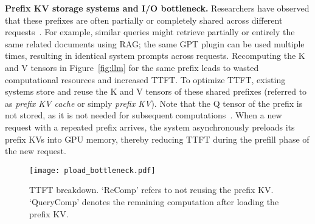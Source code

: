 \noindent \textbf{Prefix KV storage systems and I/O bottleneck.}
Researchers have observed that these prefixes are often partially or completely shared across different requests~\cite{sglang-arxiv23, chunkattention-arxiv24, cachegen-sigcomm24, ragcache-arxiv24, promptcache-mlsys24, attentionstore-atc24}. For example, similar queries might retrieve partially or entirely the same related documents using RAG; the same GPT plugin can be used multiple times, resulting in identical system prompts across requests. 
Recomputing the K and V tensors in Figure~\ref{fig:llm} for the same prefix leads to wasted computational resources and increased TTFT. To optimize TTFT, existing systems store and reuse the K and V tensors of these shared prefixes (referred to as \textit{prefix KV cache} or simply \textit{prefix KV}). Note that the Q tensor of the prefix is not stored, as it is not needed for subsequent computations~\cite{attentionstore-atc24}. When a new request with a repeated prefix arrives, the system asynchronously preloads its prefix KVs into GPU memory, thereby reducing TTFT during the prefill phase of the new request.


\begin{figure}
	\centering
	\texttt{[image: pload\_bottleneck.pdf]}
	\vspace{-0.1in}
	\caption{TTFT breakdown.
				`ReComp' refers to not reusing the prefix KV. `QueryComp' denotes the remaining computation after loading the prefix KV. }
	\label{fig:pload-bottleneck}
	\vspace{-0.15in}
\end{figure}

